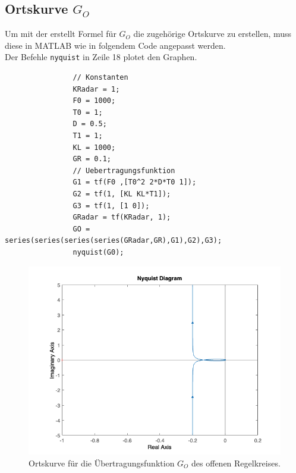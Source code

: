 \documentclass{article}
\begin{document}
		\subsection{Ortskurve $G_O$}
			Um mit der erstellt Formel für $G_O$ die zugehörige Ortskurve zu erstellen, muss diese in MATLAB wie in folgendem Code angepasst werden.\\
			Der Befehle \lstinline{nyquist} in Zeile 18 plotet den Graphen.
			\begin{lstlisting}
				// Konstanten
				KRadar = 1;
				F0 = 1000;
				T0 = 1;
				D = 0.5;
				T1 = 1;
				KL = 1000;
				GR = 0.1;
				// Uebertragungsfunktion
				G1 = tf(F0 ,[T0^2 2*D*T0 1]);
				G2 = tf(1, [KL KL*T1]);
				G3 = tf(1, [1 0]);
				GRadar = tf(KRadar, 1);
				GO = series(series(series(series(GRadar,GR),G1),G2),G3);
				nyquist(G0);
			\end{lstlisting}
\newpage
			\begin{figure}[h]
				\includegraphics[scale=0.7, center]{./Ortskurve_4_c.png}
				\caption{Ortskurve für die Übertragungsfunktion $G_O$ des offenen Regelkreises.}
				\label{fig4: Ortskurve $G_O$}
			\end{figure}
\newpage
\end{document}
